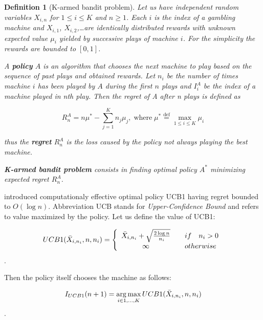 \newtheorem*{defmab}{Definition}
\begin{defmab}[K-armed bandit problem] 

Let us have independent random variables $X_{i,n}$ for $1 \le i \le K$ and $n \ge 1$. Each $i$ is
the index of a gambling machine and $X_{i,1}$, $X_{i,2}$,\ldots are identically distributed rewards
with unknown expected value $\mu_i$ yielded by successive plays of machine $i$. For the simplicity
the rewards are bounded to $[0,1]$.

A \textbf{policy} $A$ is an algorithm that chooses the next machine to play based on the sequence of
past plays and obtained rewards. Let $n_i$ be the number of times machine $i$ has been played by
$A$ during the first $n$ plays and $I_i^A$ be the index of a machine played in nth play. Then the
regret of A after n plays is defined as

\begin{equation}
R_n^A = n \mu^* - \sum_{j=1}^K n_j \mu_j \mathrm{,\;where}\;\mu^* \stackrel{\mathrm{def}}{=}
\max_{1 \le i \le K} \mu_i
\end{equation}

thus the \textbf{regret} $R_n^A$ is the loss caused by the policy not always playing the best machine.

\textbf{K-armed bandit problem} consists in finding optimal policy $A^*$ minimizing
expected regret $R_n^A$.

\end{defmab}


 introduced computationaly effective optimal policy UCB1 \cite{Auer2002} 
having regret bounded to $O(\log{n})$. Abbreviation UCB stands for \emph{Upper-Confidence Bound}
and refers to value maximized by the policy. Let us define the value of UCB1:

\begin{equation}
UCB1(\bar{X}_{i,n_i},n,n_i) = 
    \left\{
        \begin{array}{c@{\quad\quad}l}
            \bar{X}_{i,n_i} + \sqrt{{2 \log{n}} \over n_i} & if \quad n_i > 0 \\
            \infty & otherwise \\
        \end{array}
    \right.
\end{equation}.


Then the policy itself chooses the machine as follows:

\begin{equation}
 I_{UCB1}(n+1) = \operatorname*{arg\,max}\limits_{i\in{1,\ldots,K}} UCB1(\bar{X}_{i,n_i},n,n_i)
 \end{equation}.

